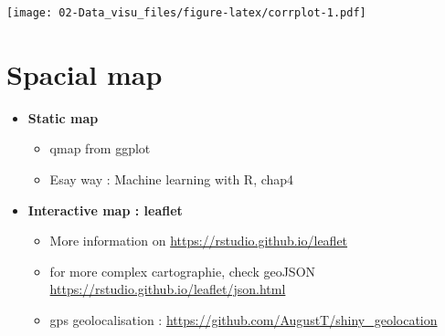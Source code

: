 \documentclass[]{book}
\providecommand{\tightlist}{%
  \setlength{\itemsep}{0pt}\setlength{\parskip}{0pt}}
\theoremstyle{definition}
\theoremstyle{definition}
\theoremstyle{definition}
\theoremstyle{remark}
\begin{document}
\texttt{[image: 02-Data\_visu\_files/figure-latex/corrplot-1.pdf]}

\section{Spacial map}\label{spacial-map}

\begin{itemize}
\tightlist
\item
  \textbf{Static map}

  \begin{itemize}
  \tightlist
  \item
    qmap from ggplot
  \item
    Esay way : Machine learning with R, chap4
  \end{itemize}
\item
  \textbf{Interactive map : leaflet}

  \begin{itemize}
  \tightlist
  \item
    More information on \url{https://rstudio.github.io/leaflet}
  \item
    for more complex cartographie, check geoJSON
    \url{https://rstudio.github.io/leaflet/json.html}
  \item
    gps geolocalisation :
    \url{https://github.com/AugustT/shiny_geolocation}
  \end{itemize}
\end{itemize}
\end{document}
